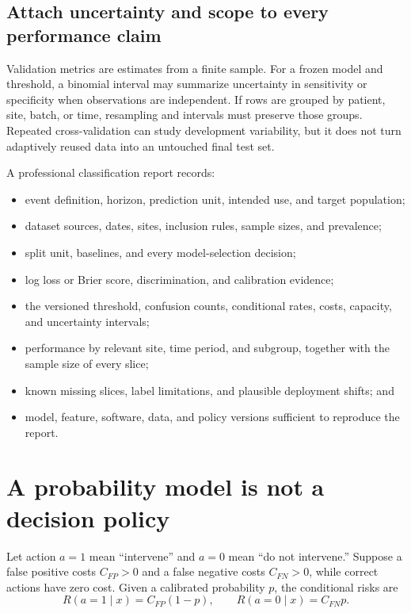 
\subsection{Attach uncertainty and scope to every performance claim}

Validation metrics are estimates from a finite sample. For a frozen model and
threshold, a binomial interval may summarize uncertainty in sensitivity or
specificity when observations are independent. If rows are grouped by patient,
site, batch, or time, resampling and intervals must preserve those groups.
Repeated cross-validation can study development variability, but it does not
turn adaptively reused data into an untouched final test set.

A professional classification report records:
\begin{itemize}
  \item event definition, horizon, prediction unit, intended use, and target
  population;
  \item dataset sources, dates, sites, inclusion rules, sample sizes, and
  prevalence;
  \item split unit, baselines, and every model-selection decision;
  \item log loss or Brier score, discrimination, and calibration evidence;
  \item the versioned threshold, confusion counts, conditional rates, costs,
  capacity, and uncertainty intervals;
  \item performance by relevant site, time period, and subgroup, together with
  the sample size of every slice;
  \item known missing slices, label limitations, and plausible deployment
  shifts; and
  \item model, feature, software, data, and policy versions sufficient to
  reproduce the report.
\end{itemize}

\section{A probability model is not a decision policy}

Let action $a=1$ mean ``intervene'' and $a=0$ mean ``do not intervene.'' Suppose
a false positive costs $C_{FP}>0$ and a false negative costs $C_{FN}>0$, while
correct actions have zero cost. Given a calibrated probability $p$, the
conditional risks are
\[
R(a=1\mid x)=C_{FP}(1-p),
\qquad
R(a=0\mid x)=C_{FN}p.
\]

